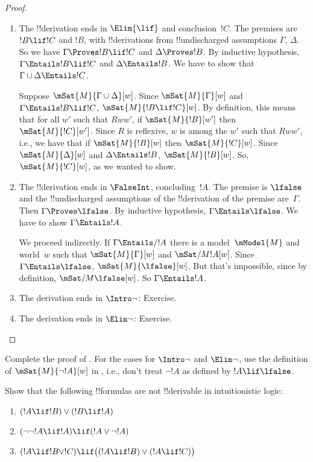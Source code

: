 \documentclass[../../../include/open-logic-section]{subfiles}
\begin{document}
\begin{proof}
\begin{enumerate}
  \item The !!{derivation} ends in $\Elim{\lif}$ and
    conclusion~$!C$. The premises are $!B \lif !C$ and $!B$, with
    !!{derivation}s from !!{undischarged} assumptions $\Gamma$,
    $\Delta$. So we have $\Gamma \Proves !B \lif !C$ and $\Delta
    \Proves !B$. By inductive hypothesis, $\Gamma \Entails !B \lif !C$
    and $\Delta \Entails !B$. We have to show that $\Gamma \cup \Delta
    \Entails !C$.

    Suppose $\mSat{M}{\Gamma \cup \Delta}[w]$. Since
    $\mSat{M}{\Gamma}[w]$ and $\Gamma \Entails !B \lif !C$,
    $\mSat{M}{!B \lif !C}[w]$. By definition, this means that for all
    $w'$ such that $Rww'$, if $\mSat{M}{!B}[w']$ then
    $\mSat{M}{!C}[w']$. Since $R$ is reflexive, $w$ is among the $w'$
    such that $Rww'$, i.e., we have that if $\mSat{M}{!B}[w]$ then
    $\mSat{M}{!C}[w]$. Since $\mSat{M}{\Delta}[w]$ and $\Delta
    \Entails !B$, $\mSat{M}{!B}[w]$. So, $\mSat{M}{!C}[w]$, as we
    wanted to show.

  \item The !!{derivation} ends in $\FalseInt$, concluding~$!A$. The
    premise is $\lfalse$ and the !!{undischarged} assumptions of the
    !!{derivation} of the premise are~$\Gamma$. Then $\Gamma \Proves
    \lfalse$. By inductive hypothesis, $\Gamma \Entails \lfalse$. We
    have to show $\Gamma \Entails !A$.

    We proceed indirectly. If $\Gamma \Entails/ !A$ there is a
    model~$\mModel{M}$ and world~$w$ such that $\mSat{M}{\Gamma}[w]$
    and $\mSat/{M}{!A}[w]$.  Since $\Gamma \Entails \lfalse$,
    $\mSat{M}{\lfalse}[w]$. But that's impossible, since by
    definition, $\mSat/{M}{\lfalse}[w]$. So $\Gamma \Entails !A$.
  \item The derivation ends in $\Intro\lnot$: Exercise.
  \item The derivation ends in $\Elim\lnot$: Exercise.
  \end{enumerate}
\end{proof}

\begin{prob}
  Complete the proof of . For the
  cases for $\Intro\lnot$ and $\Elim\lnot$, use the definition of
  $\mSat{M}{\lnot !A}[w]$ in , i.e.,
  don't treat $\lnot !A$ as defined by $!A \lif \lfalse$.
\end{prob}

\begin{prob}
  Show that the following !!{formula}s are not !!{derivable} in
  intuitionistic logic:
  \begin{enumerate}
    \item $(!A \lif !B) \lor (!B \lif !A)$
    \item $(\lnot\lnot !A \lif !A) \lif (!A \lor \lnot !A)$
    \item $(!A \lif !B \lor !C) \lif \bigl((!A \lif !B)\lor(!A \lif !C)\bigr)$
  \end{enumerate}
\end{prob}
\end{document}

